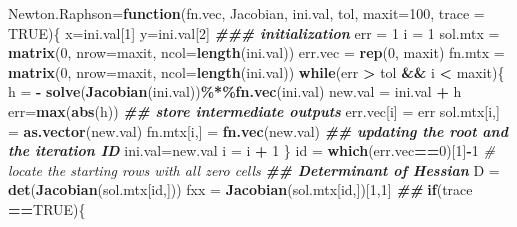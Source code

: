 \documentclass[
]{book}
\newenvironment{Shaded}{\begin{snugshade}}{\end{snugshade}}
\newcommand{\AttributeTok}[1]{\textcolor[rgb]{0.13,0.29,0.53}{#1}}
\newcommand{\CommentTok}[1]{\textcolor[rgb]{0.56,0.35,0.01}{\textit{#1}}}
\newcommand{\ConstantTok}[1]{\textcolor[rgb]{0.56,0.35,0.01}{#1}}
\newcommand{\ControlFlowTok}[1]{\textcolor[rgb]{0.13,0.29,0.53}{\textbf{#1}}}
\newcommand{\DecValTok}[1]{\textcolor[rgb]{0.00,0.00,0.81}{#1}}
\newcommand{\DocumentationTok}[1]{\textcolor[rgb]{0.56,0.35,0.01}{\textbf{\textit{#1}}}}
\newcommand{\FunctionTok}[1]{\textcolor[rgb]{0.13,0.29,0.53}{\textbf{#1}}}
\newcommand{\NormalTok}[1]{#1}
\newcommand{\OtherTok}[1]{\textcolor[rgb]{0.56,0.35,0.01}{#1}}
\newcommand{\SpecialCharTok}[1]{\textcolor[rgb]{0.81,0.36,0.00}{\textbf{#1}}}
\begin{document}
\begin{Shaded}
\begin{Highlighting}[]
\NormalTok{Newton.Raphson}\OtherTok{=}\ControlFlowTok{function}\NormalTok{(fn.vec, Jacobian, ini.val, tol, }\AttributeTok{maxit=}\DecValTok{100}\NormalTok{, }\AttributeTok{trace =} \ConstantTok{TRUE}\NormalTok{)\{}
\NormalTok{ x}\OtherTok{=}\NormalTok{ini.val[}\DecValTok{1}\NormalTok{]}
\NormalTok{ y}\OtherTok{=}\NormalTok{ini.val[}\DecValTok{2}\NormalTok{]}
 \DocumentationTok{\#\#\# initialization}
\NormalTok{ err }\OtherTok{=} \DecValTok{1}
\NormalTok{ i }\OtherTok{=} \DecValTok{1}
\NormalTok{ sol.mtx }\OtherTok{=} \FunctionTok{matrix}\NormalTok{(}\DecValTok{0}\NormalTok{, }\AttributeTok{nrow=}\NormalTok{maxit, }\AttributeTok{ncol=}\FunctionTok{length}\NormalTok{(ini.val))}
\NormalTok{ err.vec }\OtherTok{=} \FunctionTok{rep}\NormalTok{(}\DecValTok{0}\NormalTok{, maxit)}
\NormalTok{ fn.mtx }\OtherTok{=} \FunctionTok{matrix}\NormalTok{(}\DecValTok{0}\NormalTok{, }\AttributeTok{nrow=}\NormalTok{maxit, }\AttributeTok{ncol=}\FunctionTok{length}\NormalTok{(ini.val))}
 \ControlFlowTok{while}\NormalTok{(err }\SpecialCharTok{\textgreater{}}\NormalTok{ tol  }\SpecialCharTok{\&\&}\NormalTok{ i }\SpecialCharTok{\textless{}}\NormalTok{ maxit)\{}
\NormalTok{   h }\OtherTok{=} \SpecialCharTok{{-}} \FunctionTok{solve}\NormalTok{(}\FunctionTok{Jacobian}\NormalTok{(ini.val))}\SpecialCharTok{\%*\%}\FunctionTok{fn.vec}\NormalTok{(ini.val)}
\NormalTok{   new.val }\OtherTok{=}\NormalTok{ ini.val }\SpecialCharTok{+}\NormalTok{ h }
\NormalTok{   err}\OtherTok{=}\FunctionTok{max}\NormalTok{(}\FunctionTok{abs}\NormalTok{(h))}
   \DocumentationTok{\#\# store intermediate outputs}
\NormalTok{   err.vec[i] }\OtherTok{=}\NormalTok{ err}
\NormalTok{   sol.mtx[i,] }\OtherTok{=} \FunctionTok{as.vector}\NormalTok{(new.val)}
\NormalTok{   fn.mtx[i,] }\OtherTok{=} \FunctionTok{fn.vec}\NormalTok{(new.val)}
   \DocumentationTok{\#\# updating the root and the iteration ID}
\NormalTok{   ini.val}\OtherTok{=}\NormalTok{new.val}
\NormalTok{   i }\OtherTok{=}\NormalTok{ i }\SpecialCharTok{+} \DecValTok{1}
\NormalTok{  \}}
\NormalTok{  id }\OtherTok{=} \FunctionTok{which}\NormalTok{(err.vec}\SpecialCharTok{==}\DecValTok{0}\NormalTok{)[}\DecValTok{1}\NormalTok{]}\SpecialCharTok{{-}}\DecValTok{1}   \CommentTok{\# locate the starting rows with all zero cells}
  \DocumentationTok{\#\#  Determinant of Hessian}
\NormalTok{  D }\OtherTok{=} \FunctionTok{det}\NormalTok{(}\FunctionTok{Jacobian}\NormalTok{(sol.mtx[id,]))}
\NormalTok{  fxx }\OtherTok{=} \FunctionTok{Jacobian}\NormalTok{(sol.mtx[id,])[}\DecValTok{1}\NormalTok{,}\DecValTok{1}\NormalTok{]}
  \DocumentationTok{\#\#}
  \ControlFlowTok{if}\NormalTok{(trace }\SpecialCharTok{==}\ConstantTok{TRUE}\NormalTok{)\{}

\end{Highlighting}
\end{Shaded}
\end{document}
